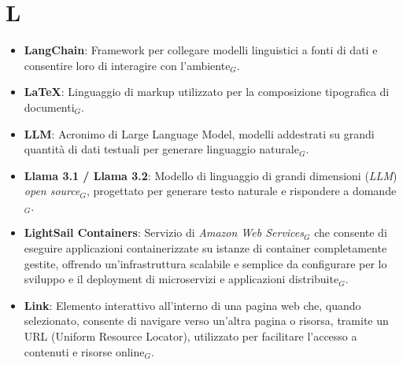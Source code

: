\section{L}
\begin{itemize}
    \item \textbf{LangChain}: Framework per collegare modelli linguistici a fonti di dati e consentire loro di interagire con l'ambiente$_G$.
    \item \textbf{LaTeX}: Linguaggio di markup utilizzato per la composizione tipografica di documenti$_G$.
    \item \textbf{LLM}: Acronimo di Large Language Model, modelli addestrati su grandi quantità di dati testuali per generare linguaggio naturale$_G$.
    \item \textbf{Llama 3.1 / Llama 3.2}: Modello di linguaggio di grandi dimensioni (\textit{LLM}) \textit{open source}$_G$, progettato per generare testo naturale e rispondere a domande$_G$.
    \item \textbf{LightSail Containers}: Servizio di \textit{Amazon Web Services}$_G$ che consente di eseguire applicazioni containerizzate su istanze di container completamente gestite, offrendo un'infrastruttura scalabile e semplice da configurare per lo sviluppo e il deployment di microservizi e applicazioni distribuite$_G$.
    \item \textbf{Link}: Elemento interattivo all'interno di una pagina web che, quando selezionato, consente di navigare verso un'altra pagina o risorsa, tramite un URL (Uniform Resource Locator), utilizzato per facilitare l'accesso a contenuti e risorse online$_G$.
\end{itemize}
